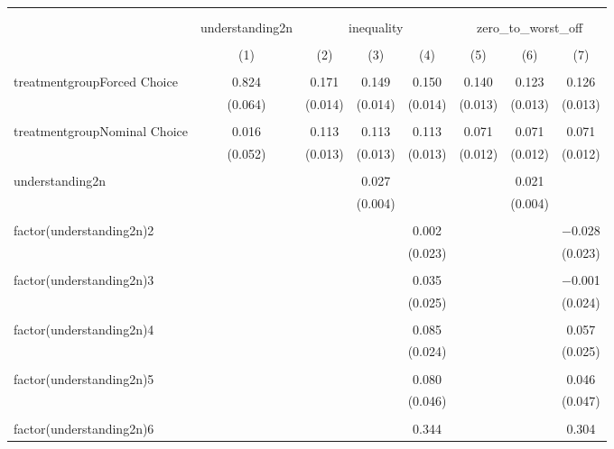 
\begin{table}[!htbp] \centering 
  \caption{} 
  \label{} 
\begin{tabular}{@{\extracolsep{5pt}}lccccccc} 
\\[-1.8ex]\hline 
\hline \\[-1.8ex] 
\\[-1.8ex] & understanding2n & \multicolumn{3}{c}{inequality} & \multicolumn{3}{c}{zero\_to\_worst\_off} \\ 
\\[-1.8ex] & (1) & (2) & (3) & (4) & (5) & (6) & (7)\\ 
\hline \\[-1.8ex] 
 treatmentgroupForced Choice & 0.824 & 0.171 & 0.149 & 0.150 & 0.140 & 0.123 & 0.126 \\ 
  & (0.064) & (0.014) & (0.014) & (0.014) & (0.013) & (0.013) & (0.013) \\ 
  & & & & & & & \\ 
 treatmentgroupNominal Choice & 0.016 & 0.113 & 0.113 & 0.113 & 0.071 & 0.071 & 0.071 \\ 
  & (0.052) & (0.013) & (0.013) & (0.013) & (0.012) & (0.012) & (0.012) \\ 
  & & & & & & & \\ 
 understanding2n &  &  & 0.027 &  &  & 0.021 &  \\ 
  &  &  & (0.004) &  &  & (0.004) &  \\ 
  & & & & & & & \\ 
 factor(understanding2n)2 &  &  &  & 0.002 &  &  & $-$0.028 \\ 
  &  &  &  & (0.023) &  &  & (0.023) \\ 
  & & & & & & & \\ 
 factor(understanding2n)3 &  &  &  & 0.035 &  &  & $-$0.001 \\ 
  &  &  &  & (0.025) &  &  & (0.024) \\ 
  & & & & & & & \\ 
 factor(understanding2n)4 &  &  &  & 0.085 &  &  & 0.057 \\ 
  &  &  &  & (0.024) &  &  & (0.025) \\ 
  & & & & & & & \\ 
 factor(understanding2n)5 &  &  &  & 0.080 &  &  & 0.046 \\ 
  &  &  &  & (0.046) &  &  & (0.047) \\ 
  & & & & & & & \\ 
 factor(understanding2n)6 &  &  &  & 0.344 &  &  & 0.304 \\ 

\end{tabular}
\end{table}
